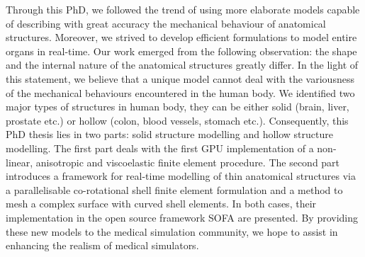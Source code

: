 Through this PhD, we followed the trend of using more elaborate models capable of describing with great accuracy the mechanical behaviour of anatomical structures. Moreover, we strived to develop efficient formulations to model entire organs in real-time. Our work emerged from the following observation: the shape and the internal nature of the anatomical structures greatly differ. In the light of this statement, we believe that a unique model cannot deal with the variousness of the mechanical behaviours encountered in the human body. We identified two major types of structures in human body, they can be either solid (brain, liver, prostate etc.) or hollow (colon, blood vessels, stomach etc.). Consequently, this PhD thesis lies in two parts: solid structure modelling and hollow structure modelling. The first part deals with the first GPU implementation of a non-linear, anisotropic and viscoelastic finite element procedure. The second part introduces a framework for real-time modelling of thin anatomical structures via a parallelisable co-rotational shell finite element formulation and a method to mesh a complex surface with curved shell elements. In both cases, their implementation in the open source framework SOFA are presented. By providing these new models to the medical simulation community, we hope to assist in enhancing the realism of medical simulators. 




